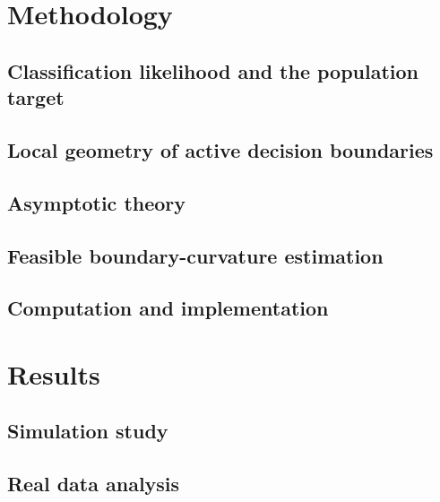 \documentclass[12pt,a4paper]{article}
\theoremstyle{definition}
\theoremstyle{remark}
\begin{document}
\section{Methodology}
\label{sec:methodology}

\subsection{Classification likelihood and the population target}
\label{sec:framework}


\subsection{Local geometry of active decision boundaries}
\label{sec:geometry}


\subsection{Asymptotic theory}
\label{sec:theory}



\subsection{Feasible boundary-curvature estimation}
\label{sec:estimation}


\subsection{Computation and implementation}
\label{sec:computation}


\section{Results}
\label{sec:results}

\subsection{Simulation study}
\label{sec:simulations}


\subsection{Real data analysis}
\label{sec:applications}

\end{document}
